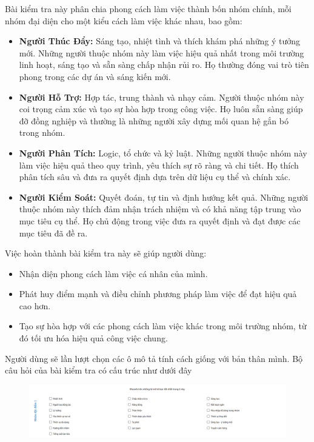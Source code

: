 Bài kiểm tra này phân chia phong cách làm việc thành bốn nhóm chính, mỗi nhóm đại diện cho một kiểu cách làm việc khác nhau, bao gồm:

\begin{itemize}
    \item \textbf{Người Thúc Đẩy:} Sáng tạo, nhiệt tình và thích khám phá những ý tưởng mới. Những người thuộc nhóm này làm việc hiệu quả nhất trong môi trường linh hoạt, sáng tạo và sẵn sàng chấp nhận rủi ro. Họ thường đóng vai trò tiên phong trong các dự án và sáng kiến mới.
    \item \textbf{Người Hỗ Trợ:} Hợp tác, trung thành và nhạy cảm. Người thuộc nhóm này coi trọng cảm xúc và tạo sự hòa hợp trong công việc. Họ luôn sẵn sàng giúp đỡ đồng nghiệp và thường là những người xây dựng mối quan hệ gắn bó trong nhóm.
    \item \textbf{Người Phân Tích:} Logic, tổ chức và kỷ luật. Những người thuộc nhóm này làm việc hiệu quả theo quy trình, yêu thích sự rõ ràng và chi tiết. Họ thích phân tích sâu và đưa ra quyết định dựa trên dữ liệu cụ thể và chính xác.
    \item \textbf{Người Kiểm Soát:} Quyết đoán, tự tin và định hướng kết quả. Những người thuộc nhóm này thích đảm nhận trách nhiệm và có khả năng tập trung vào mục tiêu cụ thể. Họ chủ động trong việc đưa ra quyết định và đạt được các mục tiêu đã đề ra.
\end{itemize}

Việc hoàn thành bài kiểm tra này sẽ giúp người dùng:

\begin{itemize}
    \item Nhận diện phong cách làm việc cá nhân của mình.
    \item Phát huy điểm mạnh và điều chỉnh phương pháp làm việc để đạt hiệu quả cao hơn.
    \item Tạo sự hòa hợp với các phong cách làm việc khác trong môi trường nhóm, từ đó tối ưu hóa hiệu quả công việc chung.
\end{itemize}

Người dùng sẽ lần lượt chọn các ô mô tả tính cách giống với bản thân mình. Bộ câu hỏi của bài kiểm tra có cấu trúc như dưới đây

\begin{figure}[H]
    \centering
    \includegraphics[width=0.9\linewidth,height=0.6\textheight]{images/ws1.png}
\end{figure}

